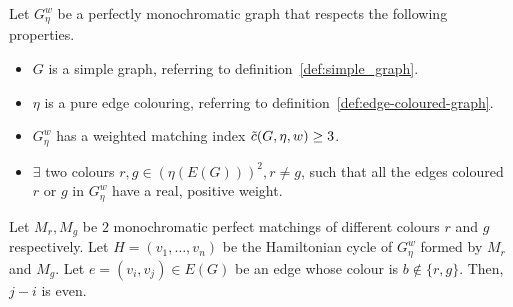 \begin{claim}
    \label{clm:2_positive_classes_parity_crossing_edge}
    Let $G_\eta^w$ be a perfectly monochromatic graph that respects the following properties.
    \begin{itemize}
        \item $G$ is a simple graph, referring to definition~\ref{def:simple_graph}.
        \item $\eta$ is a pure edge colouring, referring to definition~\ref{def:edge-coloured-graph}.
        \item $G_\eta^w$ has a weighted matching index $\Tilde{c}(G, \eta, w) \geq 3$.
        \item $\exists$ two colours $r, g \in \left(\eta(E(G))\right)^2, r \neq g$, such that all the edges coloured $r$ or $g$ in $G_\eta^w$ have a real, positive weight.
    \end{itemize}
    Let $M_r, M_g$ be $2$ monochromatic perfect matchings of different colours $r$ and $g$ respectively.
    Let $H = (v_1, \dots, v_n)$ be the Hamiltonian cycle of $G_\eta^w$ formed by $M_r$ and $M_g$.
    Let $e = (v_i, v_j) \in E(G)$ be an edge whose colour is $b \notin \{r, g\}$.
    Then, $j-i$ is even.
\end{claim}

